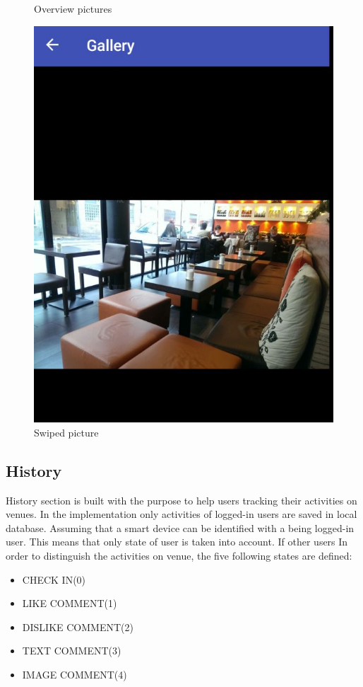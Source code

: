 \begin{figure}[!htb]
    \caption{Overview pictures}\label{fig:overimages}
	\includegraphics[width=\linewidth]{images/swipeimage.jpg}
	\caption{Swiped picture}\label{fig:swipeimage}
	\endminipage\hfill

\end{figure}

\subsection{History}
History section is built with the purpose to help users tracking their activities on venues. In the implementation  only activities of logged-in users are saved in local database. Assuming that a smart device can be identified with a being logged-in user. This means that only state of user is taken into account. If other users  In order to distinguish the activities on venue, the five following states are defined:

\begin{itemize}
	\item CHECK IN(0)
	\item LIKE COMMENT(1)
	\item DISLIKE COMMENT(2)
	\item TEXT COMMENT(3)
	\item IMAGE COMMENT(4)
\end{itemize}


